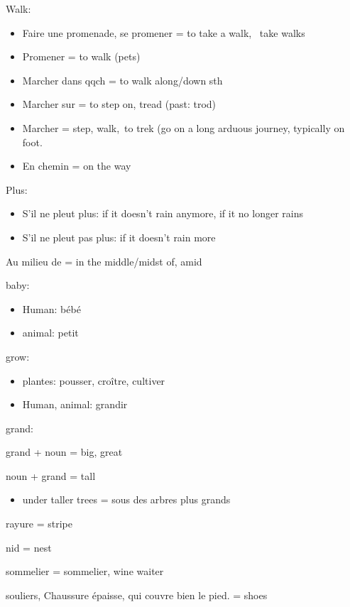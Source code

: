 Walk:

\begin{itemize}
\item
  Faire une promenade, se promener = to take a walk,~ take walks
\item
  Promener = to walk (pets)
\item
  Marcher dans qqch = to walk along/down sth
\item
  Marcher sur = to step on, tread (past: trod)
\item
  {Marcher = step, walk,~}{to trek (go on a long arduous journey,
  typically on foot.}
\item
  {En chemin = on the way~}
\end{itemize}

Plus:

\begin{itemize}
\item
  S'il ne pleut plus: if it doesn't rain anymore, if it no longer rains
\item
  S'il ne pleut pas plus: if it doesn't rain more~
\end{itemize}

Au milieu de = in the middle/midst of, amid

baby:

\begin{itemize}
\item
  Human: bébé
\item
  animal: petit
\end{itemize}

grow:

\begin{itemize}
\item
  plantes: pousser, croître, cultiver
\item
  Human, animal: grandir
\end{itemize}

grand:

grand + noun = big, great

noun + grand = tall

\begin{itemize}
\item
  under taller trees = sous des arbres plus grands
\end{itemize}

rayure = stripe

nid = nest

sommelier = sommelier, wine waiter

souliers, Chaussure épaisse, qui couvre bien le pied. = shoes

